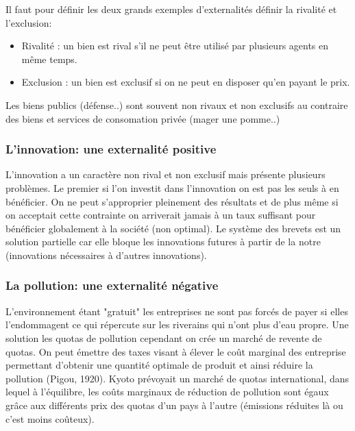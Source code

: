 Il faut pour définir les deux grands exemples d'externalités définir la rivalité et l'exclusion: 
\begin{itemize}
	\item Rivalité : un bien est rival s'il ne peut être utilisé par plusieurs agents en même temps.
	\item Exclusion : un bien est exclusif si on ne peut en disposer qu'en payant le prix.
\end{itemize}
Les biens publics (défense..) sont souvent non rivaux et non exclusifs au contraire des biens et services de consomation privée (mager une pomme..)

\subsubsection{L'innovation: une externalité positive} %
\label{sub:l_innovation_une_externalite_positive}

L'innovation a un caractère non rival et non exclusif mais présente plusieurs problèmes. Le premier si l'on investit dans l'innovation on est pas les seuls à en bénéficier. On ne peut s'approprier pleinement des résultats et de plus même si on acceptait cette contrainte on arriverait jamais à un taux suffisant pour bénéficier globalement à la société (non optimal). Le système des brevets est un solution partielle car elle bloque les innovations futures à partir de la notre (innovations nécessaires à d'autres innovations). 

\subsubsection{La pollution: une externalité négative} %
\label{sub:la_pollution_une_externalite_negative}

L'environnement étant "gratuit" les entreprises ne sont pas forcés de payer si elles l'endommagent ce qui répercute sur les riverains qui n'ont plus d'eau propre. Une solution les quotas de pollution cependant on crée un marché de revente de quotas. On peut émettre des taxes visant à élever le coût marginal des entreprise permettant d'obtenir une quantité optimale de produit et ainsi réduire la pollution (Pigou, 1920). Kyoto prévoyait un marché de quotas international, dans lequel à l'équilibre, les coûts marginaux de réduction de pollution sont égaux grâce aux différents prix des quotas d'un pays à l'autre (émissions réduites là ou c'est moins coûteux).

